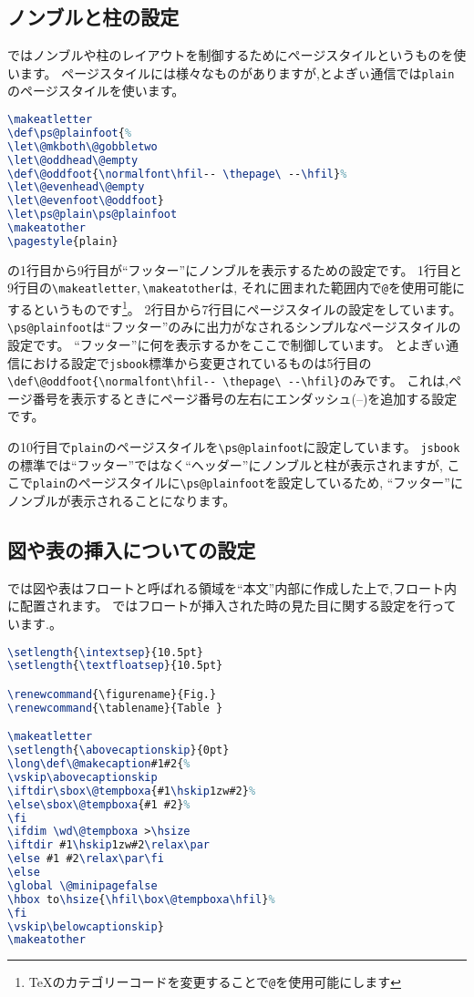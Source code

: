 \subsection{ノンブルと柱の設定}

{\pLaTeX}ではノンブルや柱のレイアウトを制御するためにページスタイルというものを使います。
ページスタイルには様々なものがありますが,とよぎぃ通信では\verb|plain|のページスタイルを使います。

\begin{lstlisting}[caption = ノンブルと柱の設定, label = list:footer, language=tex]
\makeatletter
\def\ps@plainfoot{%
\let\@mkboth\@gobbletwo
\let\@oddhead\@empty
\def\@oddfoot{\normalfont\hfil-- \thepage\ --\hfil}%
\let\@evenhead\@empty
\let\@evenfoot\@oddfoot}
\let\ps@plain\ps@plainfoot
\makeatother
\pagestyle{plain}
\end{lstlisting}

の1行目から9行目が``フッター''にノンブルを表示するための設定です。
1行目と9行目の\verb|\makeatletter|,\,\verb|\makeatother|は,
それに囲まれた範囲内で\texttt{@}を使用可能にするというものです\footnote{{\TeX}のカテゴリーコードを変更することで\texttt{@}を使用可能にします}。
2行目から7行目にページスタイルの設定をしています。
\verb|\ps@plainfoot|は``フッター''のみに出力がなされるシンプルなページスタイルの設定です。
``フッター''に何を表示するかをここで制御しています。
とよぎぃ通信における設定で\verb|jsbook|標準から変更されているものは5行目の\verb|\def\@oddfoot{\normalfont\hfil-- \thepage\ --\hfil}|のみです。
これは,ページ番号を表示するときにページ番号の左右にエンダッシュ(--)を追加する設定です。

の10行目で\verb|plain|のページスタイルを\verb|\ps@plainfoot|に設定しています。
\verb|jsbook|の標準では``フッター''ではなく``ヘッダー''にノンブルと柱が表示されますが,
ここで\verb|plain|のページスタイルに\verb|\ps@plainfoot|を設定しているため,
``フッター''にノンブルが表示されることになります。

\subsection{図や表の挿入についての設定}

{\pLaTeX}では図や表はフロートと呼ばれる領域を``本文''内部に作成した上で,フロート内に配置されます。
ではフロートが挿入された時の見た目に関する設定を行っています.。
\begin{lstlisting}[caption = フロートついての設定, label = list:float, language = tex]
\setlength{\intextsep}{10.5pt}
\setlength{\textfloatsep}{10.5pt}

\renewcommand{\figurename}{Fig.}
\renewcommand{\tablename}{Table }

\makeatletter
\setlength{\abovecaptionskip}{0pt}
\long\def\@makecaption#1#2{%
\vskip\abovecaptionskip
\iftdir\sbox\@tempboxa{#1\hskip1zw#2}%
\else\sbox\@tempboxa{#1 #2}%
\fi
\ifdim \wd\@tempboxa >\hsize
\iftdir #1\hskip1zw#2\relax\par
\else #1 #2\relax\par\fi
\else
\global \@minipagefalse
\hbox to\hsize{\hfil\box\@tempboxa\hfil}%
\fi
\vskip\belowcaptionskip}
\makeatother
\end{lstlisting}

